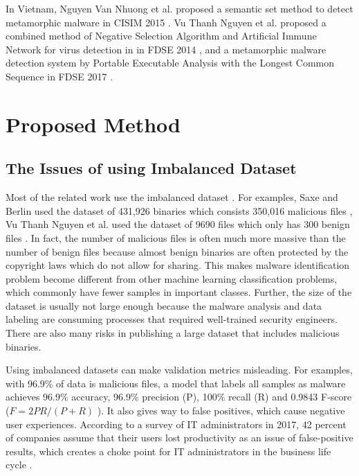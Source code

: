\documentclass[runningheads]{llncs}
\begin{document}
In Vietnam, Nguyen Van Nhuong et al. proposed a semantic set method to detect metamorphic malware in CISIM 2015 \cite{van2014semantic}. Vu Thanh Nguyen et al. proposed a combined method of Negative Selection Algorithm and Artificial Immune Network for virus detection in in FDSE 2014 \cite{nguyen2014combination}, and a metamorphic malware detection system by Portable Executable Analysis with the Longest Common Sequence in FDSE 2017 \cite{vu2017metamorphic}.

\section{Proposed Method}

\subsection{The Issues of using Imbalanced Dataset}

Most of the related work use the imbalanced dataset \cite{saxe2015deep,vu2017metamorphic}. 
For examples, Saxe and Berlin used the dataset of 431,926 binaries which consists 350,016 malicious files \cite{saxe2015deep}, Vu Thanh Nguyen et al. used the dataset of 9690 files which only has 300 benign files \cite{vu2017metamorphic}. 
In fact, the number of malicious files is often much more massive than the number of benign files because almost benign binaries are often protected by the copyright laws which do not allow for sharing. 
This makes malware identification problem become different from other machine learning classification problems, which commonly have fewer samples in important classes. 
Further, the size of the dataset is usually not large enough because the malware analysis and data labeling are consuming processes that required well-trained security engineers. 
There are also many risks in publishing a large dataset that includes malicious binaries. 

Using imbalanced datasets can make validation metrics misleading.
For examples, with 96.9\% of data is malicious files, a model that labels all samples as malware achieves 96.9\% accuracy, 96.9\% precision (P), 100\% recall (R) and 0.9843 F-score ($F =  2PR / (P + R) $ \cite{chinchor1992muc}).
It also gives way to false positives, which cause negative user experiences.
According to a survey of IT administrators in 2017, 42 percent of companies assume that their users lost productivity as an issue of false-positive results, which creates a choke point for IT administrators in the business life cycle \cite{jonathan2017survey}.
\end{document}
